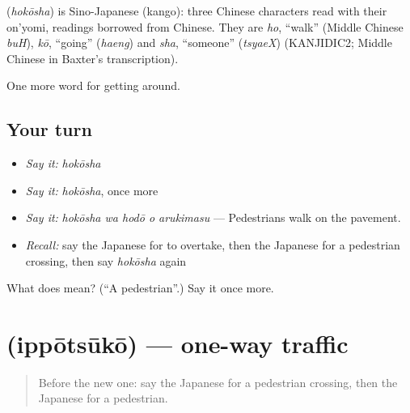 \begin{cousinweb}
\textbf{} (\emph{hokōsha}) is Sino-Japanese (kango): three Chinese characters read with their on'yomi, readings borrowed from Chinese. They are \emph{ho}, \textquotedblleft{}walk\textquotedblright{} (Middle Chinese \emph{buH}), \emph{kō}, \textquotedblleft{}going\textquotedblright{} (\emph{haeng}) and \emph{sha}, \textquotedblleft{}someone\textquotedblright{} (\emph{tsyaeX}) (KANJIDIC2; Middle Chinese in Baxter's transcription).
\end{cousinweb}

\begin{grammarlens}[title={What you've built}]
One more word for getting around.
\end{grammarlens}

\subsection*{Your turn}
\begin{itemize}
\raggedright
  \item \emph{Say it:} \emph{hokōsha}
  \item \emph{Say it:} \emph{hokōsha}, once more
  \item \emph{Say it:} \emph{hokōsha wa hodō o arukimasu} — Pedestrians walk on the pavement.
  \item \emph{Recall:} say the Japanese for to overtake, then the Japanese for a pedestrian crossing, then say \emph{hokōsha} again
\end{itemize}

\begin{tcolorbox}[breakable,colback=teal!4,colframe=teal!35!black,title={Before you move on}]
What does  mean? (\textquotedblleft{}A pedestrian\textquotedblright{}.) Say it once more.
\end{tcolorbox}
\section[\texorpdfstring{\ja{いっぽうつうこう} (ippōtsūkō)}{いっぽうつうこう (ippōtsūkō)}]{ (ippōtsūkō) — one-way traffic}

\label{lesson:JA-C391-ippoutsuukou}



\begin{quote}
Before the new one: say the Japanese for a pedestrian crossing, then the Japanese for a pedestrian.
\end{quote}

